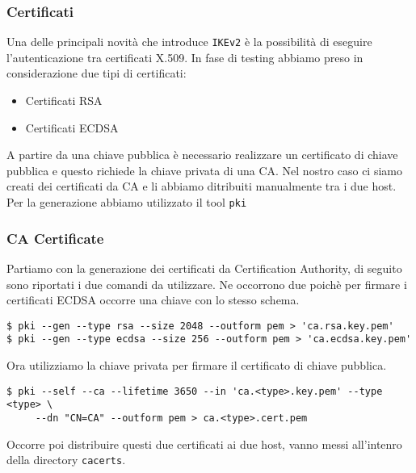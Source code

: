 \documentclass[
10pt, %
a4paper, %
oneside, %
headinclude,footinclude, %
BCOR5mm, %
]{scrartcl}
\begin{document}

\subsubsection*{Certificati}

Una delle principali novità che introduce \lstinline|IKEv2| è la possibilità di eseguire l'autenticazione tra certificati X.509. In fase di testing abbiamo preso in considerazione due tipi di certificati:

\begin{itemize}
    \item Certificati RSA
    \item Certificati ECDSA
\end{itemize}

\noindent
A partire da una chiave pubblica è necessario realizzare un certificato di chiave pubblica e questo richiede la chiave privata di una CA. 
Nel nostro caso ci siamo creati dei certificati da CA e li abbiamo ditribuiti manualmente tra i due host. \\

\noindent
Per la generazione abbiamo utilizzato il tool \lstinline|pki|

\subsubsection*{CA Certificate}
Partiamo con la generazione dei certificati da Certification Authority, di seguito sono riportati i due comandi da utilizzare. Ne occorrono due poichè per firmare
i certificati ECDSA occorre una chiave con lo stesso schema.
\vspace*{0.2cm}
\begin{lstlisting}
$ pki --gen --type rsa --size 2048 --outform pem > 'ca.rsa.key.pem'
$ pki --gen --type ecdsa --size 256 --outform pem > 'ca.ecdsa.key.pem'
\end{lstlisting} 

\vspace*{0.2cm}
\noindent
Ora utilizziamo la chiave privata per firmare il certificato di chiave pubblica.
\begin{lstlisting}
$ pki --self --ca --lifetime 3650 --in 'ca.<type>.key.pem' --type <type> \
     --dn "CN=CA" --outform pem > ca.<type>.cert.pem
\end{lstlisting}

\noindent
Occorre poi distribuire questi due certificati ai due host, vanno messi all'intenro della directory \lstinline|cacerts|.
\end{document}
